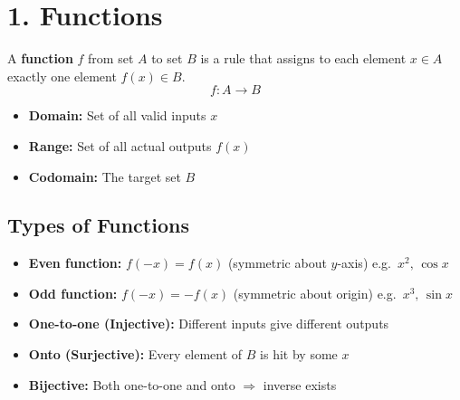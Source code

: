 \documentclass[12pt]{article}
\begin{document}
\vspace{16pt}

\begin{tcolorbox}[
  enhanced, arc=4pt, boxrule=1.5pt,
  colback=white, colframe=primary,
  left=10pt, right=10pt, top=4pt, bottom=8pt,
  title={\bfseries\color{white} Table of Contents},
  colbacktitle=primary,
  attach boxed title to top left={xshift=10pt, yshift=-\tcboxedtitleheight/2},
  boxed title style={arc=3pt, colframe=primary, boxrule=0pt},
]
\vspace{4pt}
\tableofcontents
\end{tcolorbox}

\newpage

\section{1. Functions}

\begin{defbox}[Function]
A \textbf{function} $f$ from set $A$ to set $B$ is a rule that assigns to each element $x \in A$ exactly one element $f(x) \in B$.
\[
  f : A \longrightarrow B
\]
\begin{itemize}[leftmargin=16pt]
  \item \textbf{Domain:} Set of all valid inputs $x$
  \item \textbf{Range:} Set of all actual outputs $f(x)$
  \item \textbf{Codomain:} The target set $B$
\end{itemize}
\end{defbox}

\subsection{Types of Functions}

\begin{itemize}[leftmargin=16pt, itemsep=4pt]
  \item \textbf{Even function:} $f(-x) = f(x)$ \quad (symmetric about $y$-axis) \quad e.g.\ $x^2,\,\cos x$
  \item \textbf{Odd function:} $f(-x) = -f(x)$ \quad (symmetric about origin) \quad e.g.\ $x^3,\,\sin x$
  \item \textbf{One-to-one (Injective):} Different inputs give different outputs
  \item \textbf{Onto (Surjective):} Every element of $B$ is hit by some $x$
  \item \textbf{Bijective:} Both one-to-one and onto $\Rightarrow$ inverse exists
\end{itemize}
\end{document}
